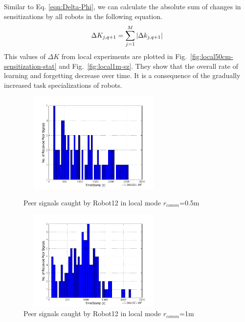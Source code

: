 \documentclass[letterpaper, 10 pt, times, conference]{ieeeconf} %
\begin{document}
%
Similar to Eq. \ref{eqn:Delta-Phi}, we can calculate the absolute sum of changes in sensitizations by all robots in the following equation.
% 
\begin{equation}
\small 
\Delta K_{j, q+1} = \sum_{j=1}^{M} \left | \Delta k_{j, q+1} \right |
\label{eqn:Delta-K}
\end{equation}
This values of $\Delta K$ from local experiments are plotted in Fig.~\ref{fig:local50cm-sensitization-stat} and Fig.~\ref{fig:local1m-sz}. They show that the overall rate of learning and forgetting decrease over time. It is a consequence of the gradually increased task specializations of robots.\\
\begin{figure}
\begin{minipage}[t]{0.5\linewidth}
\centering
\includegraphics[height=5cm,width=3in]{images/local-500cm/Robot12-16feb-1-LocalSignals}
\caption{\small Peer signals caught by Robot12 in local mode $r_{comm}$=0.5m}
\label{fig:local50cm-single-robot-signal}%
\end{minipage} 
\begin{minipage}[t]{0.5\linewidth}
\centering
\includegraphics[height=5cm,width=3in]{images/local-1m/Robot12-17feb-3-LocalSignals}
\caption{\small Peer signals caught by Robot12 in local mode $r_{comm}$=1m}
\label{fig:local1m-single-robot-signal} %
\end{minipage}
\end{figure}
\end{document}
